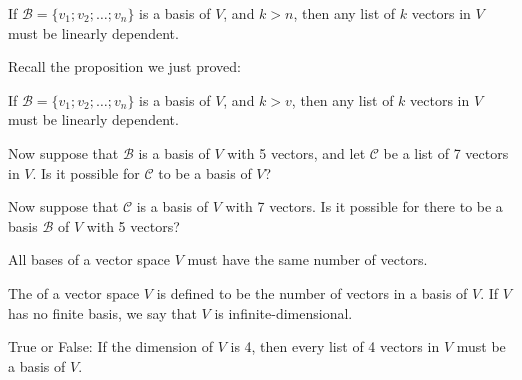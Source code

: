 {}  If $\mathcal{B}  = \{v_1; v_2; \ldots ; v_n\}$ is a basis of $V$, and $k>n$, then any list
of $k$ vectors in $V$ must be linearly dependent.  

\endedxtext


\endedxvertical








Recall the proposition we just proved: 

{}  If $\mathcal{B}  = \{v_1; v_2; \ldots ; v_n\}$ is a basis of $V$, and $k>v$, then any list
of $k$ vectors in $V$ must be linearly dependent.  

Now suppose that $\mathcal{B}$ is a basis of $V$ with 5 vectors, and let $\mathcal{C}$ be a list of 7 vectors
in $V$.  Is it possible for $\mathcal{C}$ to be a basis of $V$?  



\edXsolution{
}

\endedxproblem



Now suppose that  $\mathcal{C}$ is a basis of $V$ with 7 vectors.  Is it possible for there to be a basis $\mathcal{B}$ of $V$ with 5 vectors?  



\edXsolution{
}

\endedxproblem

\endedxvertical









{}  All bases of a vector space $V$ must have the same number of vectors.  
  

{}  
The {} of a vector space $V$ is defined to be the number of vectors in 
a basis of $V$.  If $V$ has no finite basis, we say that $V$ is infinite-dimensional.  


\endedxtext



True or False: If the dimension of $V$ is 4, then every list of 4 vectors in $V$ must be a basis of $V$.  

